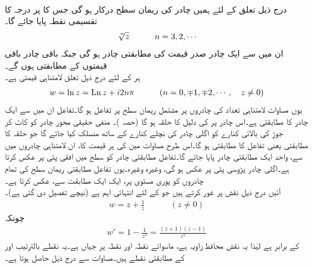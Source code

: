 \quad {}\\
درج ذیل تعلق کے لئے ہمیں  چادر کی ریمان سطح درکار ہو گی جس کا  پر درجہ   کا تقسیمی نقطہ پایا جائے گا۔
\begin{align}
\sqrt[\leftroot{-2}\uproot{2}n]{z}\quad \quad \quad n=3,2,\cdots
\end{align}
ان میں سے ایک چادر صدر قیمت کی مطابقتی چادر ہو گی جبکہ باقی  چادر باقی  قیمتوں کے مطابقتی ہوں گے۔
\quad {}\\
ہر  کے لئے درج ذیل  تعلق لامتناہی قیمتی ہے۔
\begin{align}\label{مساوات_نقش_ریمان_سطح_لوگارتھم}
w=\ln z=\operatorname{Ln} z+i2n\pi\quad \quad \quad (n=0,\mp1,\mp2,\cdots,\quad z\ne 0)
\end{align}
یوں مساوات  لامتناہی تعداد کی چادروں پر مشتمل ریمان سطح پر تفاعل ہو گا۔تفاعل  ان میں سے ایک چادر  کا مطابقتی ہے۔اس چادر پر  کی دلیل  کا حلقہ  ہو گا (حصہ )۔ منفی حقیقی محور چادر کو کاٹ کر جوڑ کی بالائی کنارے کو  اگلی چادر کی نچلے کنارے کے ساتھ منسلک کیا جائے گا جو حلقہ  کا مطابقتی یعنی تفاعل  کا مطابقتی ہو گا۔اس طرح  مساوات  میں  کی ہر قیمت کا، ان لامتناہی چادروں میں سے،  واحد ایک مطابقتی چادر پایا جائے گا۔تفاعل  مطابقتی چادر کو  سطح میں  افقی پٹی  پر عکس کرتا ہے۔اگلی چادر پڑوسی پٹی  پر عکس ہو گی، وغیرہ وغیرہ۔یوں تفاعل  مطابقتی ریمان سطح کی تمام چادروں کو  پوری  مستوی پر، ایک ایک مطابقت سے، عکس کرتا ہے۔
\quad {}\\
آئیں درج ذیل نقش پر غور کرتے ہیں جو  کے لئے انتہائی اہم ہے (نیچے تفصیل دی گئی ہے)۔
\begin{align}\label{مساوات_نقش_ہوائی_حرکیات_الف}
w=z+\frac{1}{z}\quad \quad \quad (z\ne 0)
\end{align}
چونکہ 
\begin{align*}
w'=1-\frac{1}{z^2}=\frac{(z+1)(z-1)}{z^2}
\end{align*}
کے برابر ہے لہٰذا یہ نقش محافظ زاویہ ہے، ماسوائے  نقطہ  اور نقطہ   پر جہاں  ہے۔یہ نقطے بالترتیب  اور  کے مطابقتی نقطے ہیں۔مساوات  سے درج ذیل حاصل ہوتا ہے۔
